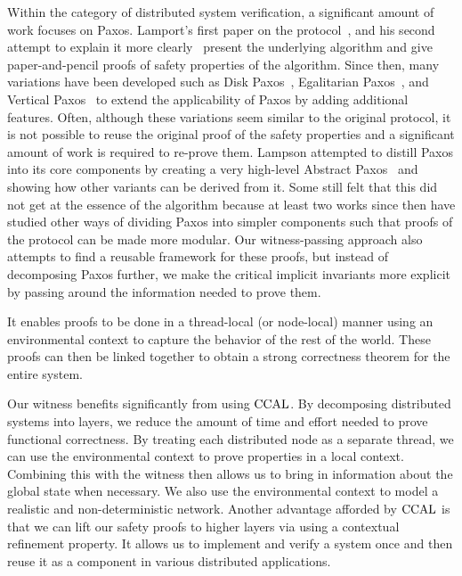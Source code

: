 Within the category of distributed system verification,
a significant amount of work focuses on Paxos.
Lamport's first paper on the protocol~\cite{paxos}, and his second attempt to explain it more clearly~\cite{paxosmadesimple}
present the underlying algorithm and give paper-and-pencil proofs of safety properties of the algorithm.
Since then, many variations have been developed such as Disk Paxos~\cite{diskpaxos}, Egalitarian Paxos~\cite{epaxos},
and Vertical Paxos~\cite{vertpaxos} to extend the applicability of Paxos by adding additional features. 
Often, although these variations seem similar to the original protocol, 
it is not possible to reuse the original
proof of the safety properties and a significant amount of work is required to re-prove them.
Lampson attempted to distill Paxos into its core components by creating a very high-level Abstract Paxos~\cite{Lampson2001}
and showing how other variants can be derived from it.
Some still felt that this did not get at the essence of the algorithm because at least two works since then \cite{dpaxos, sdpaxos}
have studied other ways of dividing Paxos into simpler components such that  proofs of the protocol can be made more modular.
Our witness-passing approach also attempts to find a reusable framework for these proofs,
but instead of decomposing Paxos further, we make the critical implicit invariants more explicit by passing around
the information needed to prove them.

It enables proofs to be done in a thread-local (or node-local) manner using an environmental context to
capture the behavior of the rest of the world.
These proofs can then be linked together to obtain a strong correctness theorem for the entire system.

Our witness benefits significantly from using $\mathrm{CCAL}$.
By decomposing distributed systems into layers, we reduce the amount of time and effort needed to
prove functional correctness.
By treating each distributed node as a separate thread, we can use the environmental context to
prove properties in a local context.
Combining this with the witness then allows us to bring in information about the global state when necessary.
We also use the environmental context to model a realistic and non-deterministic network.
Another advantage afforded by $\mathrm{CCAL}$ is that we can lift our safety proofs to higher layers via using a contextual refinement property.
It allows us to implement and verify a system once and then reuse it as a component in various distributed applications.



